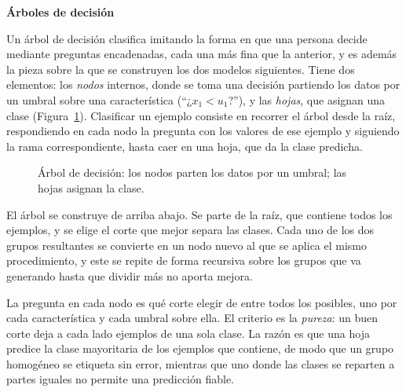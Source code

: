 \documentclass[12pt,a4paper]{report}
\theoremstyle{definition}
\begin{document}
\bigskip
\noindent\textbf{\large Árboles de decisión}
\label{sec:arboles}

\medskip
Un árbol de decisión \cite{breiman1984cart,quinlan1986id3} clasifica imitando la forma en que una
persona decide mediante preguntas encadenadas, cada una más fina que la anterior, y es además la pieza
sobre la que se construyen los dos modelos siguientes. Tiene dos elementos: los \emph{nodos} internos,
donde se toma una decisión partiendo los datos por un umbral sobre una característica (``¿$x_1<u_1$?''),
y las \emph{hojas}, que asignan una clase (Figura~\ref{fig:arbol}). Clasificar un ejemplo
consiste en recorrer el árbol desde la raíz, respondiendo en cada nodo la pregunta con los valores de
ese ejemplo y siguiendo la rama correspondiente, hasta caer en una hoja, que da la clase predicha.

\begin{figure}[H]
\centering
{}
\caption{Árbol de decisión: los nodos parten los datos por un umbral; las hojas asignan la clase.}
\label{fig:arbol}
\end{figure}

El árbol se construye de arriba abajo. Se parte de la raíz, que contiene todos los ejemplos, y se
elige el corte que mejor separa las clases. Cada uno de los dos grupos resultantes se convierte en un
nodo nuevo al que se aplica el mismo procedimiento, y este se repite de forma recursiva sobre los
grupos que va generando hasta que dividir más no aporta mejora.

La pregunta en cada nodo es qué corte elegir de entre todos los posibles, uno por cada característica y
cada umbral sobre ella. El criterio es la \emph{pureza}: un buen corte deja a cada lado ejemplos de una
sola clase. La razón es que una hoja predice la clase mayoritaria de los
ejemplos que contiene, de modo que un grupo homogéneo se etiqueta sin error, mientras que uno donde las
clases se reparten a partes iguales no permite una predicción fiable.
\end{document}

